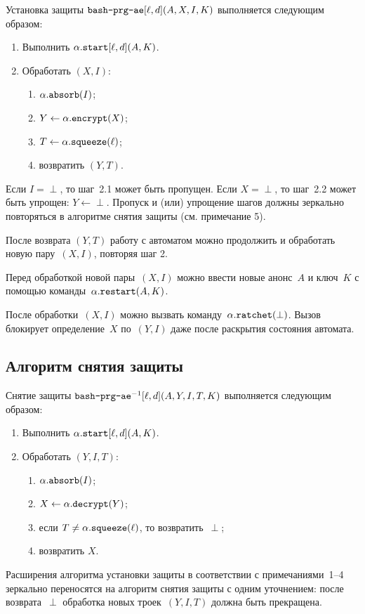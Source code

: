 Установка защиты $\texttt{bash-prg-ae}[\ell,d](A,X,I,K)$ выполняется следующим 
образом:
\begin{enumerate}
\item
Выполнить $\alpha.\texttt{start}[\ell,d](A,K)$.
\item
Обработать $(X,I)$:
\begin{enumerate}
\item
$\alpha.\texttt{absorb}(I)$;
\item
$Y\leftarrow\alpha.\texttt{encrypt}(X)$;
\item
$T\leftarrow \alpha.\texttt{squeeze}(\ell)$;
\item
возвратить $(Y,T)$.
\end{enumerate}
\end{enumerate}

\begin{note}
Если $I=\perp$, то шаг~2.1 может быть пропущен.
%
Если $X=\perp$, то шаг~2.2 может быть упрощен: $Y\leftarrow\perp$.
%
Пропуск и (или) упрощение шагов должны зеркально повторяться в алгоритме снятия 
защиты (см. примечание 5).
\end{note}

\begin{note}
После возврата $(Y,T)$ работу с автоматом
можно продолжить и обработать новую пару~$(X,I)$, повторяя шаг 2.
\end{note}

\begin{note}
Перед обработкой новой пары~$(X,I)$ можно ввести новые анонс~$A$ и ключ~$K$ с 
помощью команды~$\alpha.\texttt{restart}(A, K)$.
\end{note}

\begin{note}
После обработки~$(X,I)$ можно вызвать 
команду~$\alpha.\texttt{ratchet}(\perp)$. Вызов блокирует определение~$X$ 
по~$(Y,I)$ даже после раскрытия состояния автомата.
\end{note}

\subsection{Алгоритм снятия защиты}\label{PRG.AE.Unwrap}

Снятие защиты $\texttt{bash-prg-ae}^{-1}[\ell,d](A,Y,I,T,K)$ выполняется 
следующим образом:
\begin{enumerate}
\item
Выполнить $\alpha.\texttt{start}[\ell,d](A,K)$.
\item
Обработать $(Y,I,T)$:
\begin{enumerate}
\item
$\alpha.\texttt{absorb}(I)$;
\item
$X\leftarrow\alpha.\texttt{decrypt}(Y)$;
\item
если $T\neq\alpha.\texttt{squeeze}(\ell)$, то возвратить~$\perp$;
\item
возвратить $X$.
\end{enumerate}
\end{enumerate}

\begin{note}
Расширения алгоритма установки защиты в соответствии с примечаниями~1--4 
зеркально переносятся на алгоритм снятия защиты с одним уточнением: после 
возврата~$\perp$ обработка новых троек~$(Y,I,T)$ должна быть прекращена.
\end{note}
